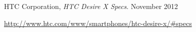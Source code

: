 \documentclass[a4paper]{article}
\begin{document}
	
	

	\begin{thebibliography}{9}
			HTC Corporation,
			\emph{HTC Desire X Specs}.
			November 2012

			\url{http://www.htc.com/www/smartphones/htc-desire-x/#specs}
	\end{thebibliography}
\end{document}
